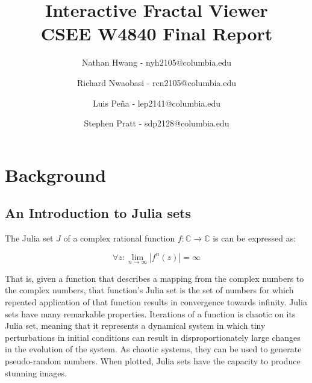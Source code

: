 \documentclass{article}
\begin{document}
\title{Interactive Fractal Viewer \\
CSEE W4840 Final Report}
\author{Nathan Hwang - nyh2105@columbia.edu \and
Richard Nwaobasi - rcn2105@columbia.edu \and
Luis Pe\~{n}a - lep2141@columbia.edu \and
Stephen Pratt - sdp2128@columbia.edu }

\maketitle
\newpage
{}



\section{Background}
\subsection{An Introduction to Julia sets}

The Julia set $J$ of a complex rational function $f: \mathbb{C} \rightarrow \mathbb{C}$ is can be expressed as:

$$
\forall z: \lim_{n \rightarrow \infty} |f^n(z)| = \infty
$$

That is, given a function that describes a mapping from the complex numbers to the complex numbers, that function's
Julia set is the set of numbers for which repeated application of that function results in convergence towards 
infinity. Julia sets have many remarkable properties. Iterations of a function is chaotic on its Julia set, meaning that it represents a dynamical system in which tiny perturbations in initial conditions can result in disproportionately large changes in 
the evolution of the system. As chaotic systems, they can be used to generate pseudo-random numbers. When plotted,
Julia sets have the capacity to produce stunning images.
\end{document}
